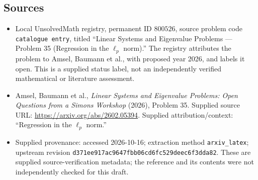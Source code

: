 \documentclass[11pt]{article}
\begin{document}
\subsection{Sources}
\begin{itemize}
\item Local UnsolvedMath registry, permanent ID \(800526\), source problem code \texttt{catalogue entry}, titled ``Linear Systems and Eigenvalue Problems --- Problem 35 (Regression in the \(\ell_p\) norm).'' The registry attributes the problem to Amsel, Baumann et al., with proposed year 2026, and labels it open. This is a supplied status label, not an independently verified mathematical or literature assessment.
\item Amsel, Baumann et al., \emph{Linear Systems and Eigenvalue Problems: Open Questions from a Simons Workshop} (2026), Problem 35. Supplied source URL: \url{https://arxiv.org/abs/2602.05394}. Supplied attribution/context: ``Regression in the \(\ell_p\) norm.''
\item Supplied provenance: accessed 2026-10-16; extraction method \texttt{arxiv\_latex}; upstream revision \texttt{d371ee917ac9647fbb06cd6fc529deec6f3dda82}. These are supplied source-verification metadata; the reference and its contents were not independently checked for this draft.
\end{itemize}
\end{document}
